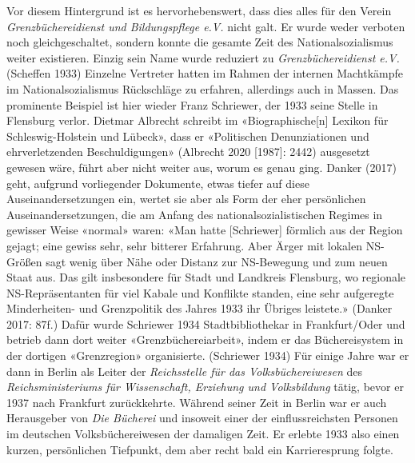 \documentclass[a4paper,
fontsize=11pt,
oneside,
numbers=noperiodatend,
parskip=half-,
bibliography=totoc,
final
]{scrartcl}
\begin{document}
Vor diesem Hintergrund ist es hervorhebenswert, dass dies alles für den
Verein \emph{Grenzbüchereidienst und Bildungspflege e.V.} nicht galt. Er
wurde weder verboten noch gleichgeschaltet, sondern konnte die gesamte
Zeit des Nationalsozialismus weiter existieren. Einzig sein Name wurde
reduziert zu \emph{Grenzbüchereidienst e.V.} (Scheffen 1933) Einzelne
Vertreter hatten im Rahmen der internen Machtkämpfe im
Nationalsozialismus Rückschläge zu erfahren, allerdings auch in Massen.
Das prominente Beispiel ist hier wieder Franz Schriewer, der 1933 seine
Stelle in Flensburg verlor. Dietmar Albrecht schreibt im
«Biographische{[}n{]} Lexikon für Schleswig-Holstein und Lübeck», dass
er «Politischen Denunziationen und ehrverletzenden Beschuldigungen»
(Albrecht 2020 {[}1987{]}: 2442) ausgesetzt gewesen wäre, führt aber
nicht weiter aus, worum es genau ging. Danker (2017) geht, aufgrund
vorliegender Dokumente, etwas tiefer auf diese Auseinandersetzungen ein,
wertet sie aber als Form der eher persönlichen Auseinandersetzungen, die
am Anfang des nationalsozialistischen Regimes in gewisser Weise «normal»
waren: «Man hatte {[}Schriewer{]} förmlich aus der Region gejagt; eine
gewiss sehr, sehr bitterer Erfahrung. Aber Ärger mit lokalen NS-Größen
sagt wenig über Nähe oder Distanz zur NS-Bewegung und zum neuen Staat
aus. Das gilt insbesondere für Stadt und Landkreis Flensburg, wo
regionale NS-Repräsentanten für viel Kabale und Konflikte standen, eine
sehr aufgeregte Minderheiten- und Grenzpolitik des Jahres 1933 ihr
Übriges leistete.» (Danker 2017: 87f.) Dafür wurde Schriewer 1934
Stadtbibliothekar in Frankfurt/Oder und betrieb dann dort weiter
«Grenzbüchereiarbeit», indem er das Büchereisystem in der dortigen
«Grenzregion» organisierte. (Schriewer 1934) Für einige Jahre war er
dann in Berlin als Leiter der \emph{Reichsstelle für das
Volksbüchereiwesen} des \emph{Reichsministeriums für Wissenschaft,
Erziehung und Volksbildung} tätig, bevor er 1937 nach Frankfurt
zurückkehrte. Während seiner Zeit in Berlin war er auch Herausgeber von
\emph{Die Bücherei} und insoweit einer der einflussreichsten Personen im
deutschen Volksbüchereiwesen der damaligen Zeit. Er erlebte 1933 also
einen kurzen, persönlichen Tiefpunkt, dem aber recht bald ein
Karrieresprung folgte.
\end{document}
